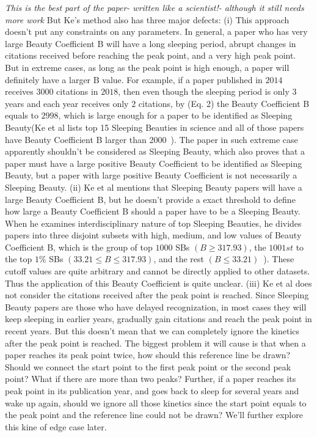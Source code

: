 \documentclass[utf8]{frontiersSCNS}
\begin{document}
{\emph{This is the best part of the paper- written like a scientist!- although it still needs more work}
But Ke's method also has three major defects: (i) This approach doesn't put any constraints on any parameters. In general, a paper who has very large Beauty Coefficient B will have a long sleeping period, abrupt changes in citations received before reaching the peak point, and a very high peak point. But in extreme cases, as long as the peak point is high enough, a paper will definitely have a larger B value. For example, if a paper published in $2014$ receives $3000$ citations in $2018$, then even though the sleeping period is only $3$ years and each year receives only $2$ citations, by (Eq. 2) the Beauty Coefficient B equals to $2998$, which is large enough for a paper to be identified as Sleeping Beauty(Ke et al lists top 15 Sleeping Beauties in science and all of those papers have Beauty Coefficient B larger than 2000~\citep{Ke2015}). The paper in such extreme case apparently shouldn't be considered as Sleeping Beauty, which also proves that a paper must have a large positive Beauty Coefficient to be identified as Sleeping Beauty, but a paper with large positive Beauty Coefficient is not necessarily a Sleeping Beauty. (ii) Ke et al mentions that Sleeping Beauty papers will have a large Beauty Coefficient B, but he doesn't provide a exact threshold to define how large a Beauty Coefficient B should a paper have to be a Sleeping Beauty. When he examines interdisciplinary nature of top Sleeping Beauties, he divides papers into three disjoint subsets with high, medium, and low values of Beauty Coefficient B, which is the group of top $1000$ SBs $(B \geq 317.93)$, the $1001st$ to the top $1\%$ SBs $(33.21 \leq B \leq 317.93)$, and the rest $(B \leq 33.21)$~\citep{Ke2015}). These cutoff values are quite arbitrary and cannot be directly applied to other datasets. Thus the application of this Beauty Coefficient is quite unclear. (iii) Ke et al does not consider the citations received after the peak point is reached. Since Sleeping Beauty papers are those who have delayed recognization, in most cases they will keep sleeping in earlier years, gradually gain citations and reach the peak point in recent years. But this doesn't mean that we can completely ignore the kinetics after the peak point is reached. The biggest problem it will cause is that when a paper reaches its peak point twice, how should this reference line be drawn? Should we connect the start point to the first peak point or the second peak point? What if there are more than two peaks? Further, if a paper reaches its peak point in its publication year, and goes back to sleep for several years and wake up again, should we ignore all those kinetics since the start point equals to the peak point and the reference line could not be drawn? We'll further explore this kine of edge case later. 

}
\end{document}
